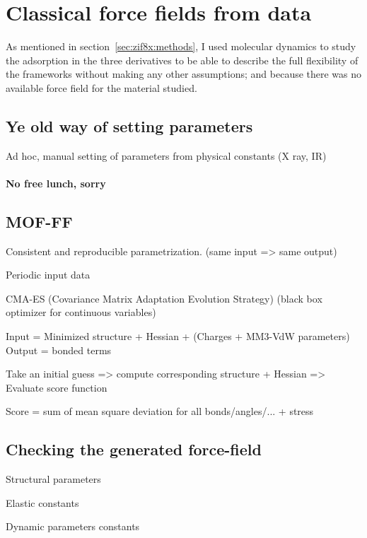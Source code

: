 \documentclass[thesis]{subfiles}
\begin{document}
\clearpage
\section{Classical force fields from \abinitio data}

As mentioned in section~\ref{sec:zif8x:methods}, I used \abinitio molecular
dynamics to study the adsorption in the three  derivatives to be able to
describe the full flexibility of the frameworks without making any other
assumptions; and because there was no available force field for the material
studied.

\subsection{Ye old way of setting parameters}

Ad hoc, manual setting of parameters from physical constants (X ray, IR)

\paragraph{No free lunch, sorry}

\subsection{MOF-FF}

Consistent and reproducible parametrization. (same input => same output)

Periodic input data

CMA-ES (Covariance Matrix Adaptation Evolution Strategy) (black box optimizer
for continuous variables)

Input = Minimized structure + Hessian + (Charges + MM3-VdW parameters)
Output = bonded terms

Take an initial guess => compute corresponding structure + Hessian => Evaluate score function

Score = sum of mean square deviation for all bonds/angles/... + stress

\subsection{Checking the generated force-field}

Structural parameters

Elastic constants

Dynamic parameters constants

\OnlyInSubfile{\printbibliography}
\end{document}
